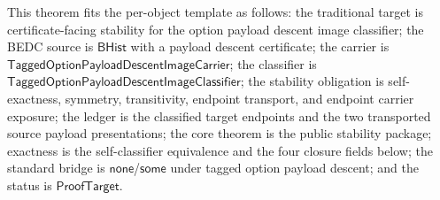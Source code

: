 \begin{theorem}
\label{thm:tagged-option-payload-descent-image-classifier-stability-package}
This theorem fits the per-object template as follows: the traditional target is
certificate-facing stability for the option payload descent image classifier; the
BEDC source is $\mathsf{BHist}$ with a payload descent certificate; the carrier is
$\mathsf{TaggedOptionPayloadDescentImageCarrier}$; the classifier is
$\mathsf{TaggedOptionPayloadDescentImageClassifier}$; the stability obligation is
self-exactness, symmetry, transitivity, endpoint transport, and endpoint carrier
exposure; the ledger is the classified target endpoints and the two transported
source payload presentations; the core theorem is the public stability package;
exactness is the self-classifier equivalence and the four closure fields below;
the standard bridge is $\mathsf{none}$/$\mathsf{some}$ under tagged option
payload descent; and the status is $\mathsf{ProofTarget}$.


\end{theorem}
